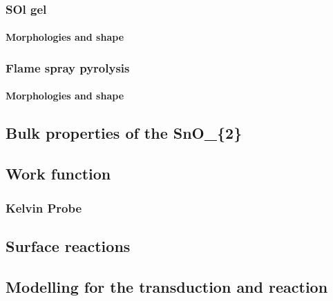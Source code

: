 \documentclass[11pt]{article}
\begin{document}
\hypertarget{sol-gel}{%
\subsubsection{SOl gel}\label{sol-gel}}

\hypertarget{morphologies-and-shape}{%
\paragraph{Morphologies and shape}\label{morphologies-and-shape}}

\hypertarget{flame-spray-pyrolysis}{%
\subsubsection{Flame spray pyrolysis}\label{flame-spray-pyrolysis}}

\hypertarget{morphologies-and-shape-1}{%
\paragraph{Morphologies and shape}\label{morphologies-and-shape-1}}

\hypertarget{bulk-properties-of-the-sno_2}{%
\subsection{Bulk properties of the
SnO\_\{2\}}\label{bulk-properties-of-the-sno_2}}

\hypertarget{work-function}{%
\subsection{Work function}\label{work-function}}

\hypertarget{kelvin-probe}{%
\subsubsection{Kelvin Probe}\label{kelvin-probe}}

\hypertarget{surface-reactions}{%
\subsection{Surface reactions}\label{surface-reactions}}

\hypertarget{modelling-for-the-transduction-and-reaction}{%
\subsection{Modelling for the transduction and
reaction}\label{modelling-for-the-transduction-and-reaction}}
\end{document}
